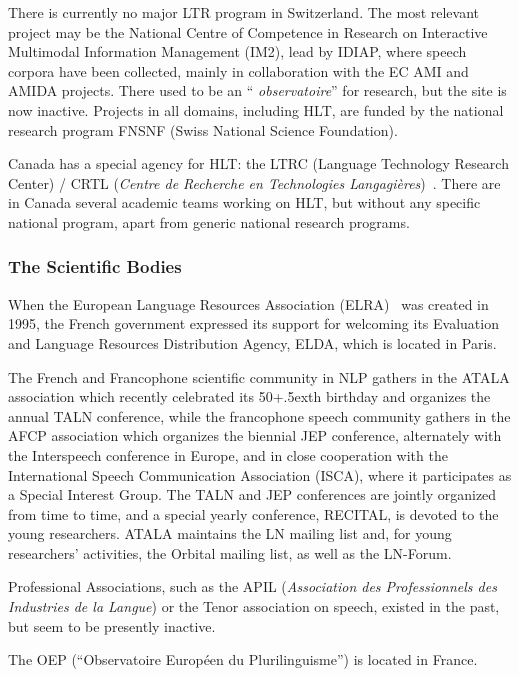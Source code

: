 \begin{multicols}{2}
There is currently no major LTR program in Switzerland. The most
relevant project may be the National Centre of Competence in Research
on Interactive Multimodal Information Management (IM2), lead by IDIAP,
where speech corpora have been collected, mainly in collaboration with
the EC AMI and AMIDA projects. There used to be an ``{\em
  observatoire}'' for research, but the site is now inactive. Projects
in all domains, including HLT, are funded by the national research
program FNSNF (Swiss National Science Foundation).

Canada has a special agency for HLT: the LTRC (Language Technology
Research Center) / CRTL ({\em Centre de Recherche en Technologies
Langagières})~\cite{canadacrtl}. There are in Canada several academic teams working on
HLT, but without any specific national program, apart from generic
national research programs.

\subsubsection{The Scientific Bodies}

When the European Language Resources Association (ELRA)~\cite{elra} was created
in 1995, the French government expressed its support for welcoming its
Evaluation and Language Resources Distribution Agency, ELDA, which is
located in Paris.

The French and Francophone scientific community in NLP gathers in the
ATALA association which recently celebrated its 50\raise+.5ex\hbox{th} birthday and
organizes the annual TALN conference, while the francophone speech
community gathers in the AFCP association which organizes the biennial
JEP conference, alternately with the Interspeech conference in Europe,
and in close cooperation with the International Speech Communication
Association (ISCA), where it participates as a Special Interest
Group. The TALN and JEP conferences are jointly organized from time to
time, and a special yearly conference, RECITAL, is devoted to the
young researchers. ATALA maintains the LN mailing list and, for young
researchers’ activities, the Orbital mailing list, as well as the
LN-Forum.

Professional Associations, such as the APIL ({\em Association des
Professionnels des Industries de la Langue}) or the Tenor association
on speech, existed in the past, but seem to be presently inactive.

The OEP (``Observatoire Européen du Plurilinguisme'') is located in France\cite{OEP}.


\end{multicols}
